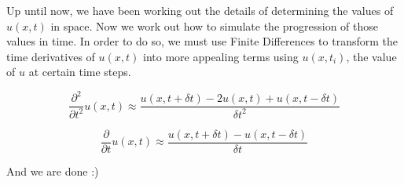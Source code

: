 Up until now, we have been working out the details of determining the values of $u(x,t)$ in space. Now we work out how to simulate the progression of those values in time. In order to do so, we must use Finite Differences to transform the time derivatives of $u(x,t)$ into more appealing terms using $u(x,t_i)$, the value of $u$ at certain time steps. 

\begin{equation}
\frac{\partial^2}{\partial t^2} u(x,t) \approx \frac{u(x,t+\delta t) - 2 u(x,t) + u(x,t-\delta t)}{\delta t^2}
\end{equation}

\begin{equation}
\frac{\partial}{\partial t} u(x,t) \approx \frac{u(x,t+\delta t) - u(x,t-\delta t)}{\delta t}
\end{equation}




And we are done :)













